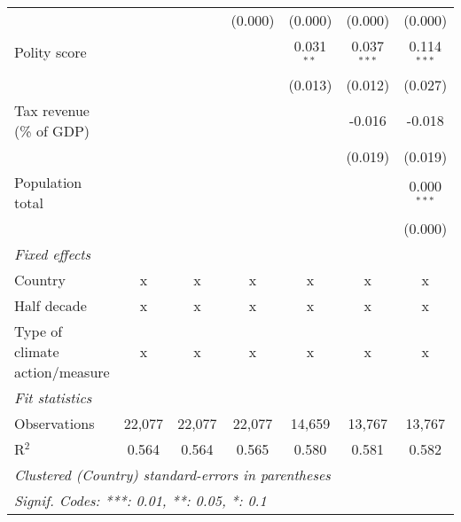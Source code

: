 \begin{tabular}{lcccccc}
                                                                              &              &                & (0.000)        & (0.000)        & (0.000)        & (0.000)\\   
   Polity score                                                               &              &                &                & 0.031$^{**}$   & 0.037$^{***}$  & 0.114$^{***}$\\   
                                                                              &              &                &                & (0.013)        & (0.012)        & (0.027)\\   
   Tax revenue (\% of GDP)                                                    &              &                &                &                & -0.016         & -0.018\\   
                                                                              &              &                &                &                & (0.019)        & (0.019)\\   
   Population total                                                           &              &                &                &                &                & 0.000$^{***}$\\   
                                                                              &              &                &                &                &                & (0.000)\\   
   \emph{Fixed effects}\\
   Country                                                                    & x            & x              & x              & x              & x              & x\\  
   Half decade                                                                & x            & x              & x              & x              & x              & x\\  
   Type of climate action/measure                                             & x            & x              & x              & x              & x              & x\\  
   \midrule \emph{Fit statistics}\\
   Observations                                                               & 22,077       & 22,077         & 22,077         & 14,659         & 13,767         & 13,767\\  
   R$^2$                                                                      & 0.564        & 0.564          & 0.565          & 0.580          & 0.581          & 0.582\\  
   \midrule
   \multicolumn{7}{l}{\emph{Clustered (Country) standard-errors in parentheses}}\\
   \multicolumn{7}{l}{\emph{Signif. Codes: ***: 0.01, **: 0.05, *: 0.1}}\\
\end{tabular}
\par\endgroup


